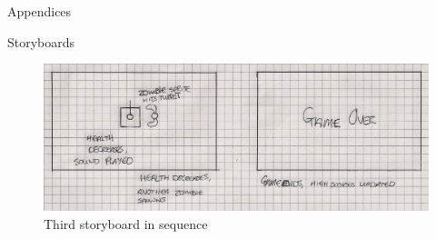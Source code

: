 \documentclass[11pt]{article}
\begin{document}
\begin{section}{Appendices}
\begin{subsection}{Storyboards}
\begin{landscape}
    		\clearpage
    		\begin{figure}[htp]
	    		\centering
                    \includegraphics[width=0.8\columnwidth]{img/storyboard_3}
	    		\caption{Third storyboard in sequence}
    		\end{figure}
        \end{landscape}
    \end{subsection}
\end{section}
\end{document}

